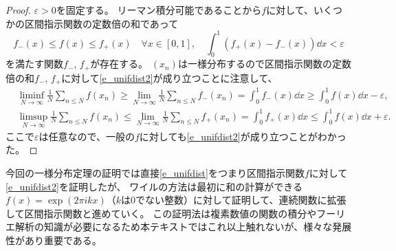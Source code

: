 \begin{proof}
$\varepsilon > 0$を固定する。
リーマン積分可能であることから$f$に対して、いくつかの区間指示関数の定数倍の和であって
$$
f_-(x) \le f(x) \le f_+(x) \quad \forall x \in [0, 1], \quad \int_0^1 (f_+(x)-f_-(x))\dd{x} < \varepsilon
$$
を満たす関数$f_-$, $f_+$が存在する。
$(x_n)$は一様分布するので区間指示関数の定数倍の和$f_-$, $f_+$に対して\eqref{e_unifdist2}が成り立つことに注意して、
\begin{align*}
&\liminf_{N \to \infty}\frac{1}{N}\sum_{n \le N}f(x_n) \ge \lim_{N \to \infty}\frac{1}{N}\sum_{n \le N}f_-(x_n) = \int_0^1 f_-(x)\dd{x} \ge \int_0^1 f(x)\dd{x}-\varepsilon, \\
&\limsup_{N \to \infty}\frac{1}{N}\sum_{n \le N}f(x_n) \le \lim_{N \to \infty}\frac{1}{N}\sum_{n \le N}f_+(x_n) = \int_0^1 f_+(x)\dd{x} \le \int_0^1 f(x)\dd{x}+\varepsilon.
\end{align*}
ここで$\varepsilon$は任意なので、一般の$f$に対しても\eqref{e_unifdist2}が成り立つことがわかった。
\end{proof}

\begin{remark}
今回の一様分布定理の証明では直接\eqref{e_unifdist}をつまり区間指示関数$f$に対して\eqref{e_unifdist2}を証明したが、
ワイルの方法は最初に和の計算ができる$f(x) = \exp(2\pi i k x)$（$k$は$0$でない整数）に対して証明して、連続関数に拡張して区間指示関数と進めていく。
この証明法は複素数値の関数の積分やフーリエ解析の知識が必要になるため本テキストではこれ以上触れないが、様々な発展性があり重要である。
\end{remark}
